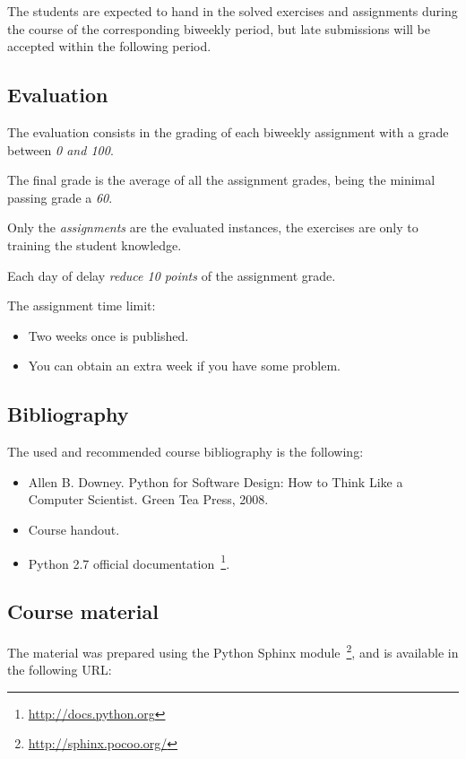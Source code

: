 \documentclass[letter, 10pt]{article}
\begin{document}
The students are expected to hand in the solved exercises and assignments
during the course of the corresponding biweekly period,
but late submissions will be accepted within the following period.

\subsection{Evaluation}

The evaluation consists in the grading of each biweekly assignment with
a grade between \emph{0 and 100}.

The final grade is the average of all the assignment grades,
being the minimal passing grade a \emph{60}. 

Only the \emph{assignments} are the evaluated instances,
the exercises are only to training the student knowledge. 

Each day of delay \emph{reduce 10 points} of the assignment grade. 

The assignment time limit:
\begin{itemize}
    \item Two weeks once is published.
    \item You can obtain an extra week if you have some problem.
\end{itemize}

\subsection{Bibliography}

The used and recommended course bibliography is the following:

\begin{itemize}
    \item Allen B. Downey. Python for Software Design: How to Think Like a Computer Scientist. Green Tea Press, 2008.
    \item Course handout.
    \item Python 2.7 official documentation~\footnote{\url{http://docs.python.org}}.
\end{itemize}

\subsection{Course material}

The material was prepared using the Python Sphinx module~\footnote{\url{http://sphinx.pocoo.org/}},
and is available in the following URL:
\end{document}
